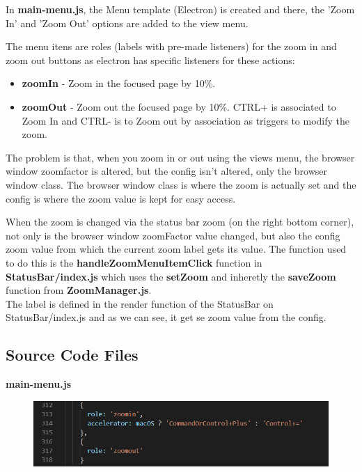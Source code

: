 \documentclass[main.tex]{subfiles}
\begin{document}
In \textbf{main-menu.js}, the Menu template (Electron) is created and there, the 'Zoom In' and 'Zoom Out' options are added to the view menu.

The menu itens are roles (labels with pre-made listeners) for the zoom in and zoom out buttons as electron has specific listeners for these actions:

\begin{itemize}
\item \textbf{zoomIn} - Zoom in the focused page by 10\%.
\item \textbf{zoomOut} - Zoom out the focused page by 10\%. CTRL+ is associated to Zoom In and CTRL- is to Zoom out by association as triggers to modify the zoom.
\end{itemize}


The problem is that, when you zoom in or out using the views menu, the browser window zoomfactor is altered, but the config isn't altered, only the browser window class. The browser window class is where the zoom is actually set and the config is where the zoom value is kept for easy access.

When the zoom is changed via the status bar zoom (on the right bottom corner), not only is the browser window zoomFactor value changed, but also the config zoom value from which the current zoom label gets its value. The function used to do this is the \textbf{handleZoomMenuItemClick} function in \textbf{StatusBar/index.js} which uses the \textbf{setZoom} and inheretly the \textbf{saveZoom} function from\textbf{ ZoomManager.js}.\\

The label is defined in the render function of the StatusBar on StatusBar/index.js and as we can see, it get se zoom value from the config.
\clearpage

\subsection{Source Code Files}

\textbf{main-menu.js}

\begin{figure}[h]
\includegraphics[scale=0.5]{images/mainMenu.png}
\centering
\end{figure}
\end{document}
